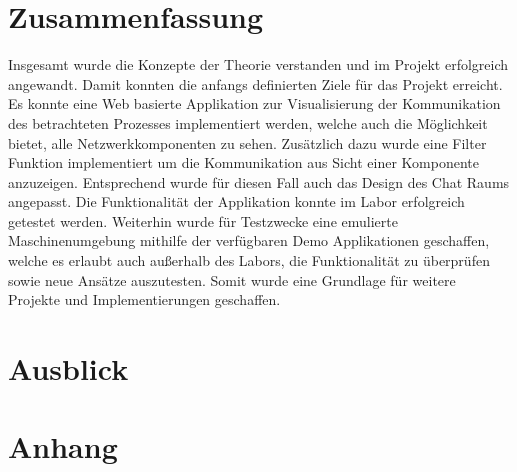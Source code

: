 \documentclass[
	12pt,								%
	DIV10,
	a4paper,         		%
	oneside,						%
	parskip=half,				%
	headings=normal,			%
	listof=totoc,					%
	bibliography=totoc,						%
	index=totoc,						%
	final								%
]{scrartcl}
\begin{document}
\section{Zusammenfassung}
Insgesamt wurde die Konzepte der Theorie verstanden und im Projekt erfolgreich angewandt.
Damit konnten die anfangs definierten Ziele für das Projekt erreicht. Es konnte eine Web basierte Applikation zur Visualisierung der Kommunikation des betrachteten Prozesses implementiert werden, welche auch die Möglichkeit bietet, alle Netzwerkkomponenten zu sehen. Zusätzlich dazu wurde eine Filter Funktion implementiert um die Kommunikation aus Sicht einer Komponente anzuzeigen. Entsprechend wurde für diesen Fall auch das Design des Chat Raums angepasst. Die Funktionalität der Applikation konnte im Labor erfolgreich getestet werden. Weiterhin wurde für Testzwecke eine emulierte Maschinenumgebung mithilfe der verfügbaren Demo Applikationen geschaffen, welche es erlaubt auch außerhalb des Labors, die Funktionalität zu überprüfen sowie neue Ansätze auszutesten. Somit wurde eine Grundlage für weitere Projekte und Implementierungen geschaffen. 
\section{Ausblick}
\section{Anhang}



\newpage







\end{document}
